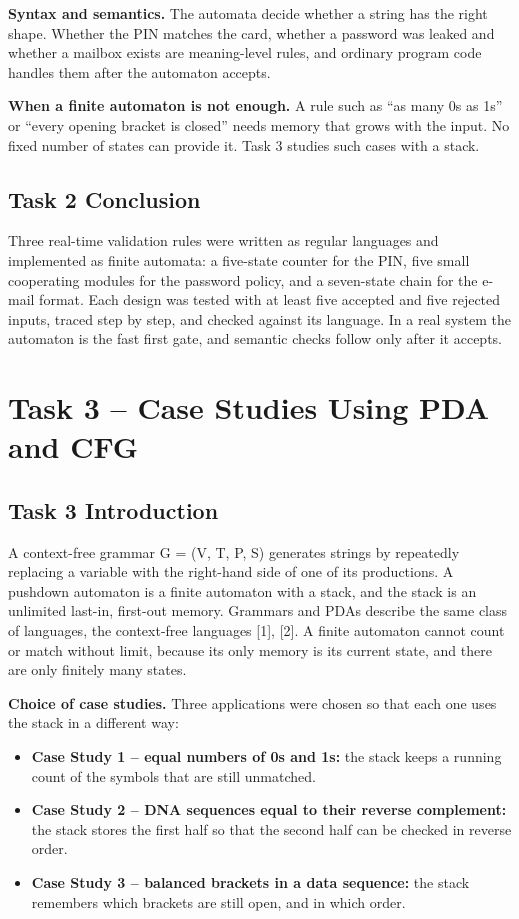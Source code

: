 \documentclass[12pt,a4paper]{article}
\begin{document}
\textbf{Syntax and semantics.} The automata decide whether a string has the right shape. Whether the PIN matches the card, whether a password was leaked and whether a mailbox exists are meaning-level rules, and ordinary program code handles them after the automaton accepts.

\textbf{When a finite automaton is not enough.} A rule such as ``as many 0s as 1s'' or ``every opening bracket is closed'' needs memory that grows with the input. No fixed number of states can provide it. Task 3 studies such cases with a stack.

\subsection{Task 2 Conclusion}

Three real-time validation rules were written as regular languages and implemented as finite automata: a five-state counter for the PIN, five small cooperating modules for the password policy, and a seven-state chain for the e-mail format. Each design was tested with at least five accepted and five rejected inputs, traced step by step, and checked against its language. In a real system the automaton is the fast first gate, and semantic checks follow only after it accepts.

\section{Task 3 -- Case Studies Using PDA and CFG}

\subsection{Task 3 Introduction}

A context-free grammar G = (V, T, P, S) generates strings by repeatedly replacing a variable with the right-hand side of one of its productions. A pushdown automaton is a finite automaton with a stack, and the stack is an unlimited last-in, first-out memory. Grammars and PDAs describe the same class of languages, the context-free languages [1], [2]. A finite automaton cannot count or match without limit, because its only memory is its current state, and there are only finitely many states.

\textbf{Choice of case studies.} Three applications were chosen so that each one uses the stack in a different way:

\begin{itemize}
\item \textbf{Case Study 1 -- equal numbers of 0s and 1s:} the stack keeps a running count of the symbols that are still unmatched.
\item \textbf{Case Study 2 -- DNA sequences equal to their reverse complement:} the stack stores the first half so that the second half can be checked in reverse order.
\item \textbf{Case Study 3 -- balanced brackets in a data sequence:} the stack remembers which brackets are still open, and in which order.
\end{itemize}
\end{document}
